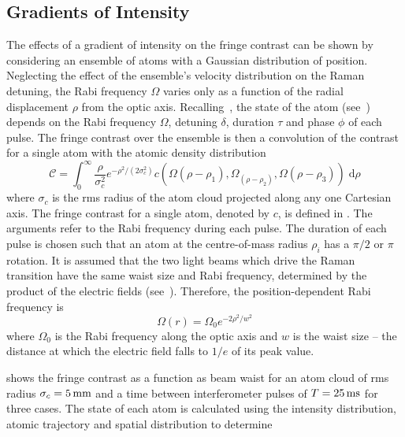 \subsection{Gradients of Intensity}\label{subsec:fringe_beam_size}
The effects of a gradient of intensity on the fringe contrast can be shown by
considering an ensemble of atoms with a Gaussian
distribution of position. Neglecting the effect of the ensemble's velocity distribution on
the Raman detuning, the Rabi frequency \(\Omega\)
varies only as a function of the radial displacement $\rho$ from the
optic axis. Recalling~, the state of the
atom (see~) depends on the Rabi frequency
$\Omega$, detuning $\delta$, duration $\tau$ and phase $\phi$ of each
pulse. The
fringe contrast over the ensemble is then a convolution of the contrast for a
single atom with the atomic density distribution
\begin{equation}
	\mathcal{C} = \int_0^\infty
  \frac{\rho}{\sigma_c^2}e^{-\rho^2/(2\sigma_c^2)}
  c\left(\Omega(\rho-\rho_1),\Omega_(\rho-\rho_2),\Omega(\rho-\rho_3)\right)
  \;\mathrm{d}\rho
	\label{eq:cloud_contrast}
\end{equation}
where \(\sigma_c\) is the rms radius of the atom cloud projected along any one
Cartesian axis. 
The fringe contrast for a single atom, denoted by $c$, is
defined in . The arguments refer to
the Rabi frequency during each pulse. The duration of each pulse is
chosen such that an atom at the centre-of-mass radius $\rho_i$ has a $\pi/2$ or $\pi$
rotation. It is
assumed that the two light beams which drive the Raman transition have the same
waist size and Rabi frequency, determined by the product of the
electric fields (see~). Therefore, the
position-dependent Rabi frequency is
\begin{equation}
	\Omega(r) = \Omega_0 e^{-2 \rho^2/w^2}
\end{equation}
where \(\Omega_0\) is the Rabi frequency along the optic axis and \(w\) is the
waist size -- the distance at which the electric field falls to \(1/e\) of its
peak value. 
\par\noindent
{} shows the fringe contrast as a function as beam waist for an atom cloud of
rms radius \(\sigma_c = \sivalue{5}{\milli\metre}\) and a time between
interferometer pulses of \(T = \sivalue{25}{\milli\second}\) for three
cases. The state of each atom is calculated using the intensity
distribution, atomic trajectory and spatial distribution to determine

